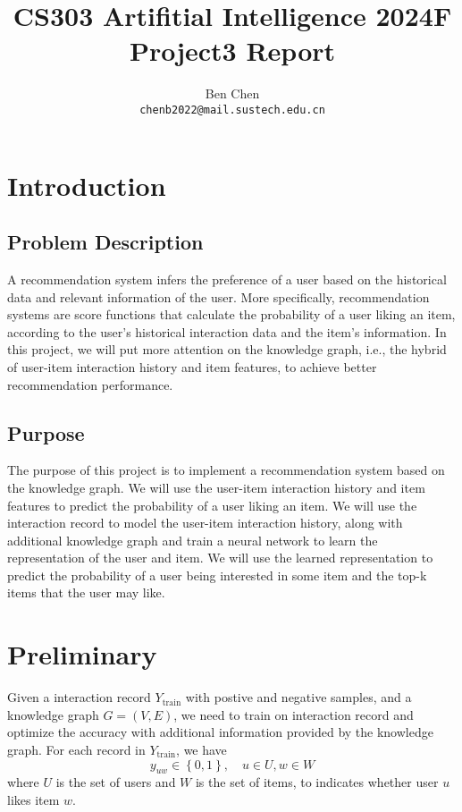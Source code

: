 \documentclass{article}
\title{\textbf{CS303 Artifitial Intelligence 2024F Project3 Report}}
\author{Ben Chen \\ \texttt{chenb2022@mail.sustech.edu.cn}}
\begin{document}
\maketitle

\section{Introduction}

\subsection{Problem Description}

A recommendation system infers the preference of a user based on the historical data and relevant information of the user. More specifically, recommendation systems are score functions that calculate the probability of a user liking an item, according to the user's historical interaction data and the item's information. In this project, we will put more attention on the knowledge graph, i.e., the hybrid of user-item interaction history and item features, to achieve better recommendation performance.

\subsection{Purpose}

The purpose of this project is to implement a recommendation system based on the knowledge graph. We will use the user-item interaction history and item features to predict the probability of a user liking an item. We will use the interaction record to model the user-item interaction history, along with additional knowledge graph and train a neural network to learn the representation of the user and item. We will use the learned representation to predict the probability of a user being interested in some item and the top-k items that the user may like.

\section{Preliminary}

Given a interaction record $Y_{\text{train}}$ with postive and negative samples, and a knowledge graph $G = (V, E)$, we need to train on interaction record and optimize the accuracy with additional information provided by the knowledge graph. For each record in $Y_{\text{train}}$, we have 
\[
    y_{uw} \in \left\{ 0, 1 \right\}, \quad u \in U, w \in W
\]
where $U$ is the set of users and $W$ is the set of items, to indicates whether user $u$ likes item $w$. 
\end{document}
